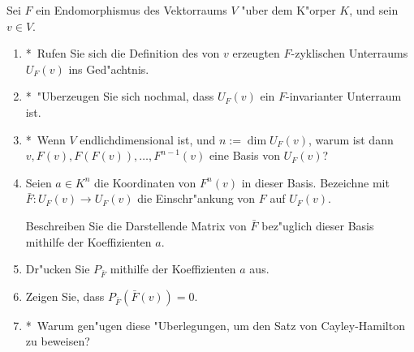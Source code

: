 \documentclass[a4,11pt]{article}
\begin{document}
\begin{aufgabe}[4 Punkte]
Sei $F$ ein Endomorphismus des Vektorraums $V$ "uber dem K"orper $K$,
und sein $v \in V$.

\newcommand{\bonusitem}{\item\hspace*{-2.4mm}*\ }

  \begin{enumerate}
  \bonusitem Rufen Sie sich die Definition des von $v$ erzeugten
    $F$-zyklischen Unterraums $U_F(v)$ ins Ged"achtnis.
  \bonusitem "Uberzeugen Sie sich nochmal, dass $U_F(v)$ ein
    $F$-invarianter Unterraum ist.
  \bonusitem Wenn $V$ endlichdimensional ist, und $n := \dim U_F(v)$, warum
    ist dann \\ $v, F(v), F(F(v)), \ldots, F^{n-1}(v)$ eine
    Basis von $U_F(v)$?
  \item Seien $a \in K^n$ die Koordinaten von $F^n(v)$ in dieser Basis.
    Bezeichne mit \\ $\bar F \colon U_F(v) \to U_F(v)$ die 
    Einschr"ankung von $F$ auf $U_F(v)$.
    
    Beschreiben Sie die Darstellende Matrix von $\bar F$ bez"uglich
    dieser Basis mithilfe der Koeffizienten $a$.
  \item Dr"ucken Sie $P_{\bar F}$ mithilfe der Koeffizienten $a$ aus.
  \item Zeigen Sie, dass $P_{\bar F}(\bar F(v)) = 0$.
  \bonusitem Warum gen"ugen diese "Uberlegungen, um den Satz von
    Cayley-Hamilton zu beweisen?
\end{enumerate}

\end{aufgabe}
\end{document}
